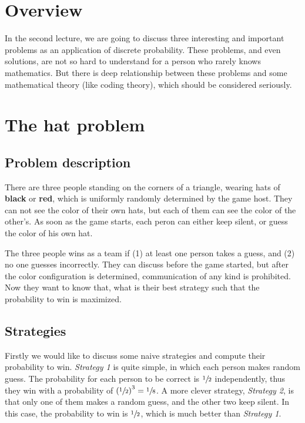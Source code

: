 \documentclass{scribe}
\begin{document}
\notetitle

\section{Overview}
\label{sec:overview}

In the second lecture, we are going to discuss three interesting and important problems as an application of discrete probability. These problems, and even solutions, are not so hard to understand for a person who rarely knows mathematics. But there is deep relationship between these problems and some mathematical theory (like coding theory), which should be considered seriously.

\section{The hat problem}
\label{sec:hats-problem}

\subsection{Problem description}
\label{sec:problem-description}

There are three people standing on the corners of a triangle, wearing hats of \textbf{black} or \textbf{\color{red}red}, which is uniformly randomly determined by the game host. They can not see the color of their own hats, but each of them can see the color of the other's. As soon as the game starts, each peron can either keep silent, or guess the color of his own hat.

The three people wins as a team if (1) at least one person takes a guess, and (2) no one guesses incorrectly. They can discuss before the game started, but after the color configuration is determined, communication of any kind is prohibited. Now they want to know that, what is their best strategy such that the probability to win is maximized.

\subsection{Strategies}
\label{sec:naive-and-clever-strategies}

Firstly we would like to discuss some naive strategies and compute their probability to win. \textit{Strategy 1} is quite simple, in which each person makes random guess. The probability for each person to be correct is $\sfrac{1}{2}$ independently, thus they win with a probability of $\left(\sfrac{1}{2}\right)^3 = \sfrac{1}{8}$. A more clever strategy, \textit{Strategy 2}, is that only one of them makes a random guess, and the other two keep silent. In this case, the probability to win is $\sfrac{1}{2}$, which is much better than \textit{Strategy 1}.
\end{document}
